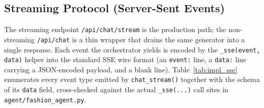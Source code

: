 \subsection{Streaming Protocol (Server-Sent Events)}

The streaming endpoint \texttt{/api/chat/stream} is the production path; the non-streaming \texttt{/api/chat} is a thin wrapper that drains the same generator into a single response. Each event the orchestrator yields is encoded by the \texttt{\_sse(event, data)} helper into the standard SSE wire format (an \texttt{event:} line, a \texttt{data:} line carrying a JSON-encoded payload, and a blank line). Table~\ref{tab:impl_sse} enumerates every event type emitted by \texttt{chat\_stream()} together with the schema of its \texttt{data} field, cross-checked against the actual \texttt{\_sse(...)} call sites in \texttt{agent/fashion\_agent.py}.

